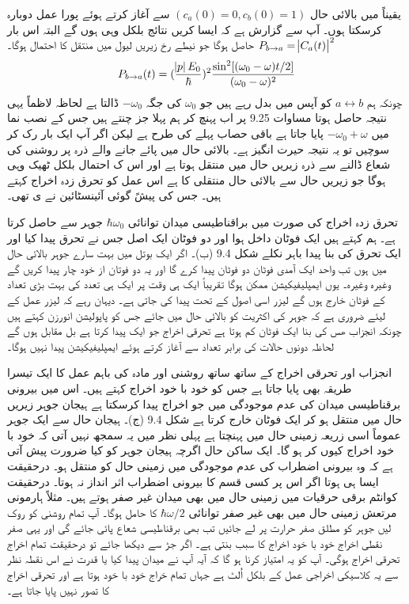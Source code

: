 \documentclass[leqno, b5paper]{khalid-urdu-book}
\begin{document}
یقیناً میں بالائی حال \((c_a(0)=0, c_b(0)=1)\) سے آغاز کرتے ہوئے پورا عمل دوبارہ کرسکتا ہوں۔ آپ سے گزارش ہے کہ ایسا کریں نتائج بلکل وہی ہوں گے البتہ اس بار \(P_{b\rightarrow a} = \abs{C_a(t)}^2\) حاصل ہوگا جو نیطے رخ زیریں لیول میں منتقل کا احتمال ہوگا۔
\begin{align}
	P_{b\rightarrow a} (t) = (\frac{\abs{p}E_0}{\hbar})^2 \frac{\sin^2[(\omega_0 - \omega)t/2]}{(\omega_0 - \omega)^2}
\end{align}
چونکہ ہم \(a\leftrightarrow b\) کو آپس میں بدل رہے ہیں جو \(\omega_0\) کی جگہ \(-\omega_0\) ڈالتا ہے لحاظہ لاظماً یہی نتیجہ حاصل ہوتا مساوات \num{9.25} پر اب پہنچ کر ہم پہلا جز چنتے ہیں جس کے نصب نما میں \(-\omega_0 + \omega\) پایا جاتا ہے باقی حصاب پہلے کی طرح ہے لیکن اگر آپ ایک بار رک کر سوچیں تو یہ نتیجہ حیرت انگیز ہے۔ بالائی حال میں پائے جانے والے ذرہ پر روشنی کی شعاع ڈالنے سے ذرہ زیریں حال میں منتقل ہوتا ہے اور اس ک احتمال بلکل ٹھیک وہی ہوگا جو زیریں حال سے بالائی حال منتقلی کا ہے اس عمل کو تحرق زدہ اخراج کہتے ہیں۔ جس کی پیشً گوئی آئینسٹائین نے ی تھی۔

تحرق زدہ اخراج کی صورت میں براقناطیسی میدان توانائی \(\hbar\omega_0\) جوہر سے حاصل کرتا ہے۔ ہم کہتے ہیں ایک فوٹان داخل ہوا اور دو فوٹان ایک اصل جس نے تحرق پیدا کیا اور ایک تحرق کی بنا پیدا باہر نکلے شکل \num{9.4} (ب)۔ اگر ایک بوتل میں بہت سارے جوہر بالائی حال میں ہوں تب واحد ایک آمدی فوٹان دو فوٹان پیدا کرے گا اور یہ دو فوتان از خود چار پیدا کریں گے وغیرہ وغیرہ۔ یوں ایمپلیفیکیشن ممکن ہوگا تقریباً ایک ہی وقت پر ایک ہی تعدد کی بہت بڑی تعداد کے فوٹان خارج ہوں گے لیزر اسی اصول کے تحت پیدا کی جاتی ہے۔ دیہان رہے کہ لیزر عمل کے لیئے ضروری ہے کہ جوہر کی اکثریت کو بالائی حال میں جائے جس کو پاپولیشن انورزن کہتے ہیں چونکہ انجزاب ھس کی بنا ایک فوٹان کم ہوتا ہے تحرقی اخراج جو ایک پیدا کرتا ہے بل مقابل ہوں گے لحاظہ دونوں حالات کی برابر تعداد سے آغاز کرتے ہوئے ایمپلیفیکیشن پیدا نہیں ہوگا۔

انجزاب اور تحرقی اخراج کے ساتھ ساتھ روشنی اور مادہ کی باہم عمل کا ایک تیسرا طریقہ بھی پایا جاتا ہے جس کو خود با خود اخراج کہتے ہیں۔ اس میں بیرونی برقناطیسی میدان کی عدم موجودگی میں جو اخراج پیدا کرسکتا ہے ہیجان جوہر زیریں حال میں منتقل ہو کر ایک فوٹان خارج کرتا ہے شکل \num{9.4} (ج)۔ 	ہیجان حال سے ایک جوہر عموماً اسی زریعہ زمینی حال میں پہنچتا ہے پہلی نظر میں یہ سمجھ نہیں آتی کہ خود با خود اخراج کیوں کر ہو گا۔ ایک ساکن حال اگرچہ ہیجان جوہر کو کیا ضرورت پیش آتی ہے کہ وہ بیرونی اضطراب کی عدم موجودگی میں زمینی حال کو منتقل ہو۔ درحقیقت ایسا ہی ہوتا اگر اس پر کسی قسم کا بیرونی اضطراب اثر انداز نہ ہوتا۔ درحقیقت کوانٹم برقی حرقیات میں زمینی حال میں بھی میدان غیر صفر ہوتے ہیں۔ مثلاً ہارمونی مرتعش زمینی حال میں بھی غیر صفر توانائی \(\hbar\omega/2\) کا حامل ہوگا۔ آپ تمام روشنی کو روک لیں جوہر کو مطلق صفر حرارت پر لے جائیں تب بھی برقناطیسی شعاع پائی جائے گی اور یہی صفر نقطی اخراج خود با خود اخراج کا سبب بنتی ہے۔ اگر جڑ سے دیکھا جائے تو درحقیقت تمام اخراج تحرقی اخراج ہوگی۔ آپ کو یہ امتیاز کرنا ہو گا کہ آیہ آپ نے میدان پیدا کیا یا قدرت نے اس نقطہ نظر سے یہ کلاسیکی اخراجی عمل کے بلکل اُلٹ ہے جہاں تمام خراج خود با خود ہوتا ہے اور تحرقی اخراج کا تصور نہیں پایا جاتا ہے۔
\end{document}
